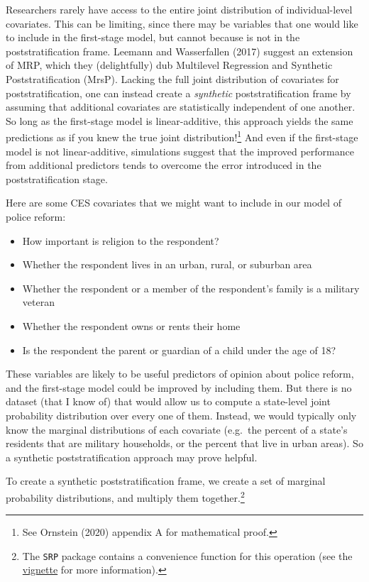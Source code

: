 \documentclass[
]{article}
\providecommand{\tightlist}{%
  \setlength{\itemsep}{0pt}\setlength{\parskip}{0pt}}
\begin{document}
Researchers rarely have access to the entire joint distribution of
individual-level covariates. This can be limiting, since there may be
variables that one would like to include in the first-stage model, but
cannot because is not in the poststratification frame. Leemann and
Wasserfallen (2017) suggest an extension of MRP, which they
(delightfully) dub Multilevel Regression and Synthetic
Poststratification (MrsP). Lacking the full joint distribution of
covariates for poststratification, one can instead create a
\emph{synthetic} poststratification frame by assuming that additional
covariates are statistically independent of one another. So long as the
first-stage model is linear-additive, this approach yields the same
predictions as if you knew the true joint distribution!\footnote{See
  Ornstein (2020) appendix A for mathematical proof.} And even if the
first-stage model is not linear-additive, simulations suggest that the
improved performance from additional predictors tends to overcome the
error introduced in the poststratification stage.

Here are some CES covariates that we might want to include in our model
of police reform:

\begin{itemize}
\tightlist
\item
  How important is religion to the respondent?
\item
  Whether the respondent lives in an urban, rural, or suburban area
\item
  Whether the respondent or a member of the respondent's family is a
  military veteran
\item
  Whether the respondent owns or rents their home
\item
  Is the respondent the parent or guardian of a child under the age of
  18?
\end{itemize}

These variables are likely to be useful predictors of opinion about
police reform, and the first-stage model could be improved by including
them. But there is no dataset (that I know of) that would allow us to
compute a state-level joint probability distribution over every one of
them. Instead, we would typically only know the marginal distributions
of each covariate (e.g.~the percent of a state's residents that are
military households, or the percent that live in urban areas). So a
synthetic poststratification approach may prove helpful.

To create a synthetic poststratification frame, we create a set of
marginal probability distributions, and multiply them
together.\footnote{The \texttt{SRP} package contains a convenience
  function for this operation (see the
  \href{https://joeornstein.github.io/software/SRP/}{vignette} for more
  information).}
\end{document}
